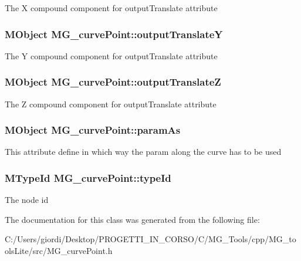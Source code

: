 The X compound component for output\-Translate attribute \hypertarget{class_m_g__curve_point_abc8256361a9df11f1e9e3df8d5c636a6}{
\subsubsection[{output\-Translate\-Y}]{\setlength{\rightskip}{0pt plus 5cm}M\-Object M\-G\-\_\-curve\-Point\-::output\-Translate\-Y\hspace{0.3cm}{\ttfamily [static]}}}\label{class_m_g__curve_point_abc8256361a9df11f1e9e3df8d5c636a6}
The Y compound component for output\-Translate attribute \hypertarget{class_m_g__curve_point_ab4c552f7a4df2a5cf4317414756604f2}{
\subsubsection[{output\-Translate\-Z}]{\setlength{\rightskip}{0pt plus 5cm}M\-Object M\-G\-\_\-curve\-Point\-::output\-Translate\-Z\hspace{0.3cm}{\ttfamily [static]}}}\label{class_m_g__curve_point_ab4c552f7a4df2a5cf4317414756604f2}
The Z compound component for output\-Translate attribute \hypertarget{class_m_g__curve_point_a6e9c40cd444c7b9a33d8f5bc8535284d}{
\subsubsection[{param\-As}]{\setlength{\rightskip}{0pt plus 5cm}M\-Object M\-G\-\_\-curve\-Point\-::param\-As\hspace{0.3cm}{\ttfamily [static]}}}\label{class_m_g__curve_point_a6e9c40cd444c7b9a33d8f5bc8535284d}
This attribute define in which way the param along the curve has to be used \hypertarget{class_m_g__curve_point_abed748ebe3d1bf04847b9a2902faeff8}{
\subsubsection[{type\-Id}]{\setlength{\rightskip}{0pt plus 5cm}M\-Type\-Id M\-G\-\_\-curve\-Point\-::type\-Id\hspace{0.3cm}{\ttfamily [static]}}}\label{class_m_g__curve_point_abed748ebe3d1bf04847b9a2902faeff8}
The node id 

The documentation for this class was generated from the following file\-:\begin{DoxyCompactItemize}
\item 
C\-:/\-Users/giordi/\-Desktop/\-P\-R\-O\-G\-E\-T\-T\-I\-\_\-\-I\-N\-\_\-\-C\-O\-R\-S\-O/\-C/\-M\-G\-\_\-\-Tools/cpp/\-M\-G\-\_\-tools\-Lite/src/M\-G\-\_\-curve\-Point.\-h\end{DoxyCompactItemize}
